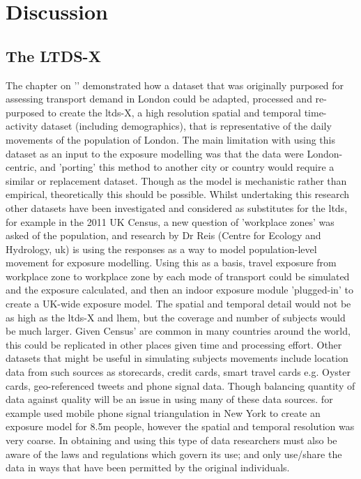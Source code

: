\newpage
\section{Discussion}
\label{sec:wrap_up_discussion}

\subsection{The LTDS-X}
\label{ltds_discussion_wrapup}


The chapter on '' demonstrated how a dataset that was originally purposed for assessing transport demand in London could be adapted, processed and re-purposed to create the \gls{ltds}-X, a high resolution spatial and temporal time-activity dataset (including demographics), that is representative of the daily movements of the population of London. The main limitation with using this dataset as an input to the exposure modelling was that the data were London-centric, and 'porting' this method to another city or country would require a similar or replacement dataset. Though as the model is mechanistic rather than empirical, theoretically this should be possible. Whilst undertaking this research other datasets have been investigated and considered as substitutes for the \gls{ltds}, for example in the 2011 UK Census, a new question of 'workplace zones' was asked of the population, and research by Dr Reis (Centre for Ecology and Hydrology, \gls{uk}) is using the responses as a way to model population-level movement for exposure modelling. Using this as a basis, travel exposure from workplace zone to workplace zone by each mode of transport could be simulated and the exposure calculated, and then an indoor exposure module 'plugged-in' to create a UK-wide exposure model. The spatial and temporal detail would not be as high as the \gls{ltds}-X and \gls{lhem}, but the coverage and number of subjects would be much larger. Given Census' are common in many countries around the world, this could be replicated in other places given time and processing effort. Other datasets that might be useful in simulating subjects movements include location data from such sources as storecards, credit cards, smart travel cards e.g. Oyster cards, geo-referenced tweets and phone signal data. Though balancing quantity of data against quality will be an issue in using many of these data sources. \cite{Nyhan2016} for example used mobile phone signal triangulation in New York to create an exposure model for 8.5m people, however the spatial and temporal resolution was very coarse. In obtaining and using this type of data researchers must also be aware of the laws and regulations which govern its use; and only use/share the data in ways that have been permitted by the original individuals.

